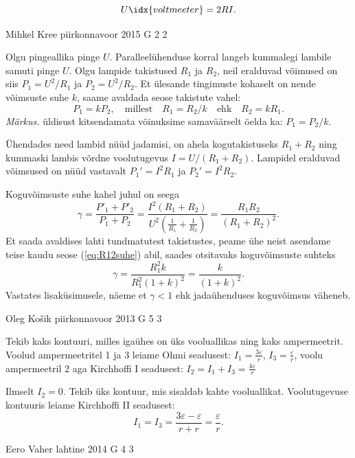 \documentclass[11pt, twoside]{article}
\begin{document}
{{\[ U\idx{voltmeeter} = 2RI.\]
\fi
}

{Mihkel Kree} %
{piirkonnavoor} %
{2015} %
{G 2} %
{2} %
{

\ifSolution
Olgu pingeallika pinge $U$. Paralleelühenduse korral langeb kummalegi lambile samuti pinge $U$. Olgu lampide takistused $R_1$ ja $R_2$, neil eralduvad võimused on siis $P_1=U^2/R_1$ ja $P_2=U^2/R_2$. Et ülesande tingimuste kohaselt on nende võimsuste suhe $k$, saame avaldada seose takistute vahel:
\begin{equation}
\label{eq:R12suhe}
P_1 = kP_2, \quad \text{millest} \quad R_1 = R_2/k \quad \text{ehk} \quad R_2=kR_1.
\end{equation}
\emph{Märkus.} üldisust kitsendamata võinuksime samaväärselt öelda ka: $P_1 = P_2/k$.

Ühendades need lambid nüüd jadamisi, on ahela kogutakistuseks $R_1+R_2$ ning kummaski lambis võrdne voolutugevus $I=U/(R_1+R_2)$. Lampidel eralduvad võimsused on nüüd vastavalt $P_1'=I^2R_1$ ja $P_2'=I^2R_2$.

Koguvõimsuste suhe kahel juhul on seega
\[
\gamma = \frac{P'_1+P'_2}{P_1+P_2} = \frac{I^2(R_1+R_2)}{U^2(\frac{1}{R_1}+\frac{1}{R_2})}=
\frac{R_1R_2}{(R_1+R_2)^2}.
\]
Et saada avaldises lahti tundmatutest takistustes, peame ühe neist asendame teise kaudu seose (\ref{eq:R12suhe}) abil, saades otsitavaks koguvõimsuste suhteks
\[
\gamma = \frac{R_1^2 k}{R_1^2(1+k)^2} = \frac{k}{(1+k)^2}.
\]
Vastates lisaküsimusele, näeme et $\gamma < 1$ ehk jadaühenduses koguvõimsus väheneb.
\fi
}

{Oleg Košik} %
{piirkonnavoor} %
{2013} %
{G 5} %
{3} %
{

\ifSolution
\osa Tekib kaks kontuuri, milles igaühes on üks vooluallikas ning kaks ampermeetrit. Voolud ampermeetritel 1 ja 3 leiame Ohmi seadusest: $I_1=\frac{3\varepsilon}{r}$, $I_3=\frac{\varepsilon}{r}$, voolu ampermeetril 2 aga Kirchhoffi I seadusest: $I_2=I_1+I_3=\frac{4\varepsilon}{r}$

\osa Ilmselt  $I_2=0$. Tekib üks kontuur, mis sisaldab kahte vooluallikat. Voolutugevuse kontuuris leiame Kirchhoffi II seadusest:
\[
I_1=I_3=\frac{3\varepsilon-\varepsilon}{r+r}=\frac{\varepsilon}{r}.
\]
\fi
}

{Eero Vaher} %
{lahtine} %
{2014} %
{G 4} %
{3} %
{

}}
\end{document}
